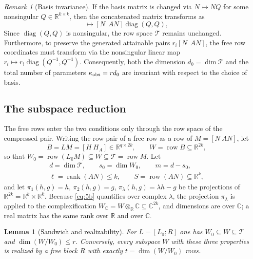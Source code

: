 \documentclass[journal]{IEEEtran}
\theoremstyle{plainn}
\newtheorem{lem}[thm]{Lemma}
\theoremstyle{remark}
\newtheorem{remark}{Remark}
\begin{document}
\begin{remark}[Basis invariance]
If the basis matrix is changed via $N\mapsto NQ$ for some nonsingular $Q\in\mathbb R^{k\times k}$, then the concatenated matrix transforms as
\begin{equation*}
[N\ \ AN]\mapsto[N\ \ AN]\operatorname{diag}(Q,Q),
\end{equation*}
Since \(\operatorname{diag}(Q,Q)\) is nonsingular, the row space \(\mathcal T\) remains unchanged. Furthermore, to preserve the generated attainable pairs \(r_i[N\ \ AN]\), the free row coordinates must transform via the nonsingular linear map \(r_i \mapsto r_i \operatorname{diag}(Q^{-1}, Q^{-1})\). Consequently, both the dimension \(d_0 = \dim\mathcal T\) and the total number of parameters \(\kappa_{\rm obs} = r d_0\) are invariant with respect to the choice of basis.
\end{remark}

\subsection{The subspace reduction}\label{sec:subspace}

The free rows enter the two conditions only through the row space of the compressed
pair. Writing the row pair of a free row as a row of $M=[N\ AN]$, let
\begin{equation}\label{eq:W-def}
B=LM=[H\ H_A]\in\mathbb R^{q\times2k},\qquad W=\operatorname{row}B\subseteq\mathbb R^{2k},
\end{equation}
so that $W_0=\operatorname{row}(L_0M)\subseteq W\subseteq\mathcal T=\operatorname{row}M$.
Let
\begin{equation}\label{eq:ell}
\begin{gathered}
d=\dim\mathcal T,\qquad s_0=\dim W_0,\qquad m=d-s_0,\\
\ell=\operatorname{rank}(AN)\le k,\qquad S=\operatorname{row}(AN)\subseteq\mathbb R^k ,
\end{gathered}
\end{equation}
and let $\pi_1(h,g)=h$, $\pi_2(h,g)=g$, $\pi_\lambda(h,g)=\lambda h-g$ be the projections of
$\mathbb R^{2k}=\mathbb R^k\times\mathbb R^k$. Because \eqref{eq:5b} quantifies over complex
$\lambda$, the projection $\pi_\lambda$ is applied to the complexification
$W_{\mathbb C}=W\otimes_{\mathbb R}\mathbb C\subseteq\mathbb C^{2k}$, and dimensions are over
$\mathbb C$; a real matrix has the same rank over $\mathbb R$ and over $\mathbb C$.

\begin{lem}[Sandwich and realizability]\label{lem:sandwich}
For $L=[L_0;R]$ one has $W_0\subseteq W\subseteq\mathcal T$ and
$\dim(W/W_0)\le r$. Conversely, every subspace $W$ with these three properties is realized by a
free block $R$ with exactly $t=\dim(W/W_0)$ rows.
\end{lem}
\end{document}
